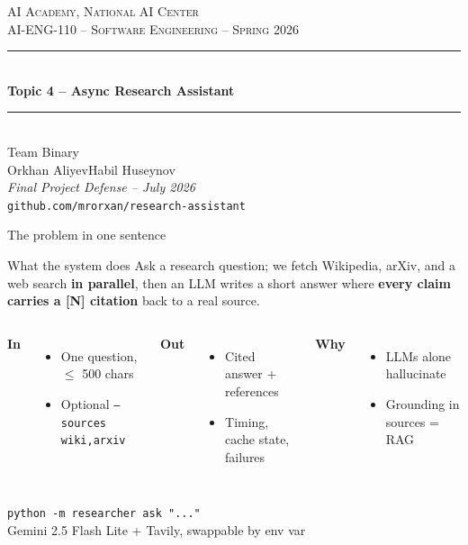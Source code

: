 \documentclass[aspectratio=169,10pt]{beamer}
\newcommand{\teamname}{Binary}
\newcommand{\topicchoice}{Topic 4 -- Async Research Assistant}
\newcommand{\memberone}{Orkhan Aliyev}
\newcommand{\membertwo}{Habil Huseynov}
\newcommand{\repolink}{github.com/mrorxan/research-assistant}
\newcommand{\coursecode}{AI-ENG-110}
\newcommand{\coursename}{Software Engineering}
\newcommand{\institution}{AI Academy, National AI Center}
\newcommand{\semester}{Spring 2026}
\begin{document}
\begin{frame}
  \begin{center}
    \vspace{0.4cm}
    {\small \textsc{\institution}}\\[0.2em]
    {\small \textsc{\coursecode{} -- \coursename{} -- \semester{}}}\\[1.1em]
    \rule{0.7\textwidth}{0.6pt}\\[0.4em]
    {\Huge\bfseries\color{accent} \topicchoice}\\[0.4em]
    \rule{0.7\textwidth}{0.6pt}\\[1.1em]
    {\large Team \teamname}\\[0.5em]
    {\normalsize \memberone\quad\textbullet\quad\membertwo}\\[0.9cm]
    {\footnotesize\itshape Final Project Defense -- July 2026}\\[0.3em]
    {\footnotesize\texttt{\repolink}}
  \end{center}
\end{frame}

\begin{frame}{The problem in one sentence}
  \begin{block}{What the system does}
    Ask a research question; we fetch Wikipedia, arXiv, and a web search
    \textbf{in parallel}, then an LLM writes a short answer where
    \textbf{every claim carries a [N] citation} back to a real source.
  \end{block}

  \vspace{0.6em}
  \begin{columns}[T,onlytextwidth]
  \textbf{In}
  \begin{itemize}
    \item One question, $\le$ 500 chars
    \item Optional \texttt{--sources wiki,arxiv}
  \end{itemize}

  \textbf{Out}
  \begin{itemize}
    \item Cited answer + references
    \item Timing, cache state, failures
  \end{itemize}

  \textbf{Why}
  \begin{itemize}
    \item LLMs alone hallucinate
    \item Grounding in sources = RAG
  \end{itemize}
  \end{columns}

  \vspace{0.9em}
  \centering
  \texttt{python -m researcher ask "..."}\\[0.3em]
  {\footnotesize Gemini 2.5 Flash Lite + Tavily, swappable by env var}
\end{frame}
\end{document}

